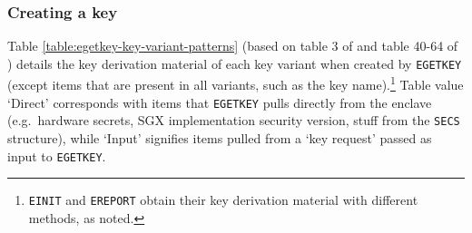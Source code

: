 \subsubsection{Creating a key}

Table \ref{table:egetkey-key-variant-patterns} (based on table 3 of \cite{sgx-epid-provisioning-attestation} and table 40-64 of \cite{sgx-manual}) details the key derivation material of each key variant when created by {\tt EGETKEY} (except items that are present in all variants, such as the key name).\footnote{{\tt EINIT} and {\tt EREPORT} obtain their key derivation material with different methods, as noted.} Table value `Direct' corresponds with items that {\tt EGETKEY} pulls directly from the enclave (e.g.\ hardware secrets, SGX implementation security version, stuff from the {\tt SECS} structure), while `Input' signifies items pulled from a `key request' passed as input to {\tt EGETKEY}.

